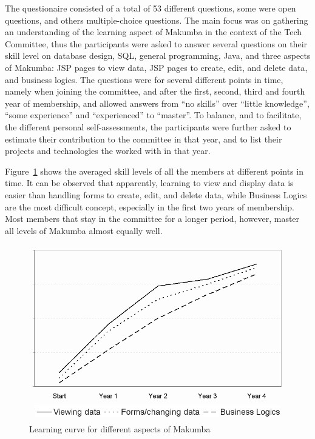 \documentclass{acm_proc_article-sp}
\begin{document}
The questionaire consisted of a total of 53 different questions, some were open questions, and others multiple-choice questions. The main focus was on gathering an understanding of the learning aspect of Makumba in the context of the Tech Committee, thus the participants were asked to answer several questions on their skill level on database design, SQL, general programming, Java, and three aspects of Makumba: JSP pages to view data, JSP pages to create, edit, and delete data, and business logics. The questions were for several different points in time, namely when joining the committee, and after the first, second, third and fourth year of membership, and allowed answers from ``no skills'' over ``little knowledge'', ``some experience'' and ``experienced'' to ``master''. To balance, and to facilitate, the different personal self-assessments, the participants were further asked to estimate their contribution to the committee in that year, and to list their projects and technologies the worked with in that year.

Figure~\ref{fig:learning-technologies} shows the averaged skill levels of all the members at different points in time. It can be observed that apparently, learning to view and display data is easier than handling forms to create, edit, and delete data, while Business Logics are the most difficult concept, especially in the first two years of membership. Most members that stay in the committee for a longer period, however, master all levels of Makumba almost equally well.

\begin{figure}\label{fig:learning-technologies}
  \includegraphics[width=0.98\columnwidth]{figures/learning-technologies}
  \caption{Learning curve for different aspects of Makumba}
\end{figure} 
\end{document}

